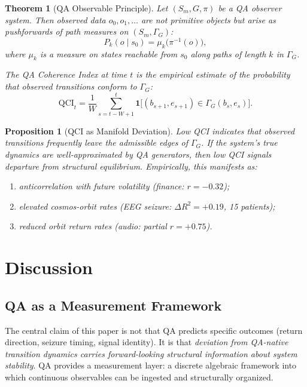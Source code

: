 \documentclass[11pt,a4paper]{article}
\newtheorem{theorem}{Theorem}
\newtheorem{proposition}{Proposition}
\begin{document}
\begin{theorem}[QA Observable Principle]
\label{thm:observable}
Let $(S_m, G, \pi)$ be a QA observer system. Then observed data
$o_0, o_1, \ldots$ are not primitive objects but arise as pushforwards of
path measures on $(S_m, \Gamma_G)$:
\[
  P_k(o \mid s_0) = \mu_k\bigl(\pi^{-1}(o)\bigr),
\]
where $\mu_k$ is a measure on states reachable from $s_0$ along paths of
length $k$ in $\Gamma_G$.

The \emph{QA Coherence Index} at time $t$ is the empirical estimate of
the probability that observed transitions conform to $\Gamma_G$:
\[
  \mathrm{QCI}_t = \frac{1}{W}\sum_{s=t-W+1}^{t}
    \mathbf{1}\bigl[(b_{s+1}, e_{s+1}) \in \Gamma_G(b_s, e_s)\bigr].
\]
\end{theorem}

\begin{proposition}[QCI as Manifold Deviation]
\label{prop:deviation}
Low QCI indicates that observed transitions frequently leave the admissible
edges of $\Gamma_G$. If the system's true dynamics are well-approximated
by QA generators, then low QCI signals departure from structural equilibrium.
Empirically, this manifests as:
\begin{enumerate}
  \item anticorrelation with future volatility (finance: $r = -0.32$);
  \item elevated cosmos-orbit rates (EEG seizure: $\Delta R^2 = +0.19$, 15 patients);
  \item reduced orbit return rates (audio: partial $r = +0.75$).
\end{enumerate}
\end{proposition}

\section{Discussion}
\label{sec:discussion}

\subsection{QA as a Measurement Framework}

The central claim of this paper is not that QA predicts specific outcomes
(return direction, seizure timing, signal identity). It is that
\emph{deviation from QA-native transition dynamics carries forward-looking
structural information about system stability}. QA provides a measurement
layer: a discrete algebraic framework into which continuous observables can
be ingested and structurally organized.
\end{document}
